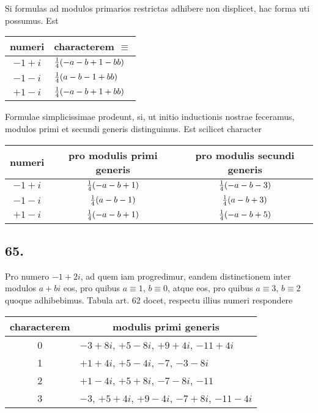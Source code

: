 \documentclass[twoside,12pt]{memoir}
\let\oldfrac\frac
\def\frac#1#2{\mathchoice{\tfrac{#1}{#2}}{\oldfrac{#1}{#2}}{\genfrac{}{}{}{2}{#1}{#2\mathstrut}}{\genfrac{}{}{}{3}{#1}{#2\mathstrut}}}
\begin{document}
Si formulas ad modulos primarios restrictas adhibere non displicet, hac forma uti possumus. Est
\begin{center}
\begin{tabular}{c|l}
numeri &\multicolumn{1}{c}{ characterem \(\equiv\)} \\
\hline
\(-1+i\) & \(\frac{1}{4}(-a-b+1-b b)\) \\
\(-1-i\) & \(\frac{1}{4}(a-b-1+b b)\) \\
\(+1-i\) & \(\frac{1}{4}(-a-b+1+b b)\) \\
\end{tabular}
\end{center}
Formulae simplicissimae prodeunt, si, ut initio inductionis nostrae feceramus, modulos primi et secundi generis distinguimus. Est scilicet character
\begin{center}
\begin{tabular}{c|c|c}
numeri & pro modulis primi generis & pro modulis secundi generis \\
\hline
\(-1+i\) & \(\frac{1}{4}(-a-b+1)\) & \(\frac{1}{4}(-a-b-3)\) \\
\(-1-i\) & \(\frac{1}{4}(a-b-1)\) & \(\frac{1}{4}(a-b+3)\) \\
\(+1-i\) & \(\frac{1}{4}(-a-b+1)\) & \(\frac{1}{4}(-a-b+5)\) \\
\end{tabular}
\end{center}

\subsection*{65.}
 
Pro numero \(-1+2 i\), ad quem iam progredimur, eandem distinctionem inter modulos \(a+b i\) eos, pro quibus \(a \equiv 1\), \( b \equiv 0\), atque eos, pro quibus \(a \equiv 3\), \( b \equiv 2\) quoque adhibebimus. Tabula art. 62 docet, respectu illius numeri respondere\pagebreak%
\begin{center}
\begin{tabular}{c|l}
characterem & \multicolumn{1}{c}{modulis primi generis} \\
\hline
0 & \(-3+8 i\), \(+5-8 i\), \(+9+4 i\), \(-11+4 i\) \\
1 & \(+1+4 i\), \(+5-4 i\), \(-7\), \(-3-8 i\) \\
2 & \(+1-4 i\), \(+5+8 i\), \(-7-8 i\), \(-11\) \\
3 & \(-3\), \(+5+4 i\), \(+9-4 i\), \(-7+8 i\), \(-11-4 i\) \\
\end{tabular}
\end{center}
 
\end{document}
